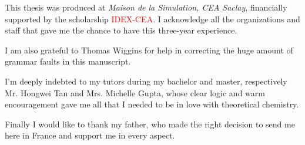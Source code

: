 This thesis was produced at\textit{ Maison de la Simulation, CEA Saclay},
financially supported by the scholarship \textcolor{red}{IDEX-CEA}.
I acknowledge all the organizations and staff that gave me the chance
to have this three-year experience.

I am also grateful to Thomas Wiggins for help in correcting the huge
amount of grammar faults in this manuscript.

I'm deeply indebted to my tutors during my bachelor and master, respectively
Mr. Hongwei Tan and Mrs. Michelle Gupta, whose clear logic and warm
encouragement gave me all that I needed to be in love with theoretical
chemistry.

Finally I would like to thank my father, who made the right decision
to send me here in France and support me in every aspect.

\endgroup
